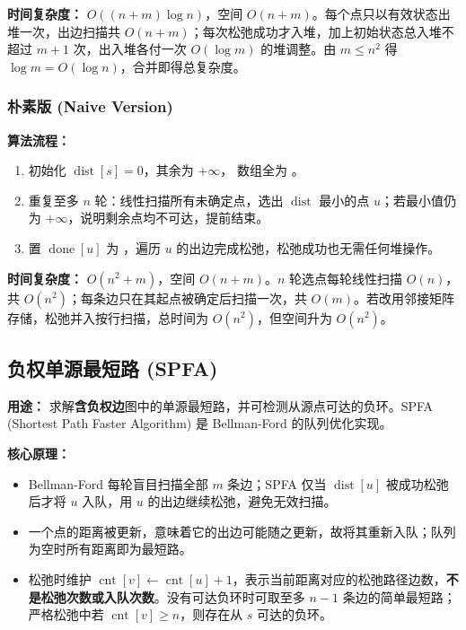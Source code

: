 \textbf{时间复杂度：} $O((n + m) \log n)$，空间 $O(n + m)$。每个点只以有效状态出堆一次，出边扫描共 $O(n + m)$；每次松弛成功才入堆，加上初始状态总入堆不超过 $m + 1$ 次，出入堆各付一次 $O(\log m)$ 的堆调整。由 $m \le n^2$ 得 $\log m = O(\log n)$，合并即得总复杂度。



\subsubsection{朴素版 (Naive Version)}

\textbf{算法流程：}

\begin{enumerate}
  \item 初始化 $\operatorname{dist}[s] = 0$，其余为 $+\infty$， 数组全为 。
  \item 重复至多 $n$ 轮：线性扫描所有未确定点，选出 $\operatorname{dist}$ 最小的点 $u$；若最小值仍为 $+\infty$，说明剩余点均不可达，提前结束。
  \item 置 $\operatorname{done}[u]$ 为 ，遍历 $u$ 的出边完成松弛，松弛成功也无需任何堆操作。
\end{enumerate}

\textbf{时间复杂度：} $O(n^2 + m)$，空间 $O(n + m)$。$n$ 轮选点每轮线性扫描 $O(n)$，共 $O(n^2)$；每条边只在其起点被确定后扫描一次，共 $O(m)$。若改用邻接矩阵存储，松弛并入按行扫描，总时间为 $O(n^2)$，但空间升为 $O(n^2)$。



\subsection{负权单源最短路 (SPFA)}

\textbf{用途：} 求解\textbf{含负权边}图中的单源最短路，并可检测从源点可达的负环。SPFA (Shortest Path Faster Algorithm) 是 Bellman-Ford 的队列优化实现。

\textbf{核心原理：}

\begin{itemize}
  \item Bellman-Ford 每轮盲目扫描全部 $m$ 条边；SPFA 仅当 $\operatorname{dist}[u]$ 被成功松弛后才将 $u$ 入队，用 $u$ 的出边继续松弛，避免无效扫描。
  \item 一个点的距离被更新，意味着它的出边可能随之更新，故将其重新入队；队列为空时所有距离即为最短路。
  \item 松弛时维护 $\operatorname{cnt}[v] \gets \operatorname{cnt}[u] + 1$，表示当前距离对应的松弛路径边数，\textbf{不是松弛次数或入队次数}。没有可达负环时可取至多 $n-1$ 条边的简单最短路；严格松弛中若 $\operatorname{cnt}[v]\ge n$，则存在从 $s$ 可达的负环。
\end{itemize}

